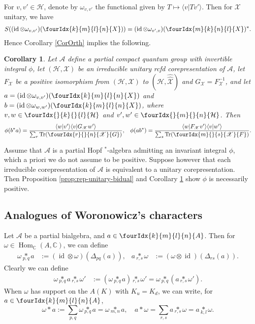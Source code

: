 \documentclass[10pt]{article}
\DeclareMathOperator{\id}{id}
\DeclareMathOperator{\Hom}{Hom}
\newcommand{\dualco}[1]{\hat{#1}}
\newcommand{\C}{\mathbb{C}}
\newcommand{\Hsp}{\mathcal{H}}
\newcommand{\Tr}{\mathrm{Tr}}
\newcommand{\Gr}[5]{\fourIdx{#2}{#4}{#3}{#5}{#1}}%
\newcommand{\Gru}[3]{\Gr{#1}{}{}{#2}{#3}}
\newcommand{\aste}[1]{\underset{#1}{\ast}}
\newtheorem{Cor}[Theorem]{Corollary}
\theoremstyle{definition}
\numberwithin{equation}{section}
\begin{document}
For $v,v'\in \Hsp$, denote by $\omega_{v,v'}$ the functional
given by $T \mapsto \langle v|Tv'\rangle$. Then for $\mathscr{X}$ unitary, we have 
\begin{align*}
  S((\id \otimes \omega_{v,v'})(\Gr{X}{k}{l}{m}{n})) =
  (\id \otimes \omega_{v',v})(\Gr{X}{m}{n}{k}{l})^{*}.
\end{align*}
Hence Corollary \ref{CorOrth} implies the following.
\begin{Cor}\label{cor:rep-unitary-schur-orthogonality}
  Let $\mathscr{A}$ define a partial compact quantum group with
  invertible integral $\phi$, let $(\Hsp,\mathscr{X})$ be an irreducible
  unitary rcfd corepresentation of $\mathscr{A}$, let $F_{\mathscr{X}}$ be a positive
  isomorphism from $(\Hsp,\mathscr{X})$ to
  $(\Hsp,\dualco{\dualco{\mathscr{X}}})$ and
  $G_{\mathscr{X}}=F^{-1}_{{\mathscr{X}}}$, and let $a=(\id \otimes
  \omega_{v,v'})(\Gr{X}{k}{l}{m}{n})$ and $b=(\id \otimes
  \omega_{w,w'})(\Gr{X}{k}{l}{m}{n})$, where $v,w \in
  \Gru{\Hsp}{k}{l}$ and $v',w' \in \Gru{\Hsp}{m}{n}$.  Then
\begin{align*}
  \phi(b^{*}a) &= \frac{\langle w|v'\rangle\langle v|G_{\mathscr{X}}w'\rangle}{\sum_{r}
    \Tr(\Gr{G}{r}{n}{}{\mathscr{X}})}, & \phi(ab^{*}) = \frac{\langle
    w|F_{\mathscr{X}}v'\rangle \langle v|w'\rangle}{\sum_{s}
    \Tr(\Gr{F}{m}{s}{}{\mathscr{X}})}.
\end{align*}
\end{Cor}

Assume that $\mathscr{A}$ is a partial Hopf $^*$-algebra admitting an invariant integral $\phi$, which a priori we do not assume to be positive. Suppose however that each irreducible corepresentation of $\mathscr{A}$ is equivalent to a unitary corepresentation. Then Proposition \ref{prop:rep-unitary-bidual} and Corollary \ref{cor:rep-unitary-schur-orthogonality} show  $\phi$ is necessarily positive.

\subsection{Analogues of Woronowicz's  characters}

Let $\mathscr{A}$ be a partial bialgebra, and $a\in \Gr{A}{k}{l}{m}{n}$. Then for $\omega \in \Hom_{\C}(A,\C)$, we can define
\begin{align*}
  \omega \aste{p,q} a
&:= (\id \otimes \omega) (\Delta_{pq}(a)), & a \aste{r,s}
\omega&:=(\omega \otimes \id)(\Delta_{rs}(a)).\end{align*} Clearly we can define
\begin{align*} \omega \aste{p,q} a \aste{r,s}
\omega'&:= (\omega \aste{p,q} a)\aste{r,s} \omega' = \omega \aste{p,q}(a \aste{r,s} \omega').\end{align*}
When $\omega$ has support on the $A(K)$ with $K_u=K_d$, we can write, for $a\in \Gr{A}{k}{l}{m}{n}$, \[\omega\ast a := \sum_{p,q} \omega\aste{p,q}a = \omega\aste{m,n}a,\quad  a\ast \omega = \sum_{r,s} a\aste{r,s}\omega = a\aste{k,l}\omega.\] 
\end{document}
